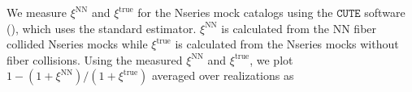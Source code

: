                                                                                                                                                                                                                                                                           We measure $\xi^\mathrm{NN}$ and $\xi^\mathrm{true}$ for the Nseries 
                                                                                                                                                                                                                                                                          mock catalogs using the $\mathtt{CUTE}$ software (\citealt{Alonso:2012aa}), which 
                                                                                                                                                                                                                                                                          uses the standard \cite{Landy:1993aa} estimator. $\xi^\mathrm{NN}$ 
                                                                                                                                                                                                                                                                          is calculated from the NN fiber collided Nseries mocks while 
                                                                                                                                                                                                                                                                          $\xi^\mathrm{true}$ is calculated from the Nseries mocks without fiber 
                                                                                                                                                                                                                                                                          collisions. Using the measured $\xi^\mathrm{NN}$ and $\xi^\mathrm{true}$, 
                                                                                                                                                                                                                                                                          we plot 
                                                                                                                                                                                                                                                                          $1- (1+\xi^\mathrm{NN})/(1 + \xi^\mathrm{true})$ averaged over realizations as 
